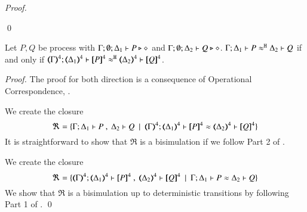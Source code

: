 \begin{proof}
\begin{enumerate}[$\bullet$]
	\end{enumerate}
	\qed
\end{proof}


\begin{proposition}\myrm
	\label{app:prop:fulla_pHOp_to_HOp}
	Let $P, Q$ be \HOpp process with $\Gamma; \emptyset; \Delta_1 \vdash P \triangleright \diamond$ and 
	$\Gamma; \emptyset; \Delta_2 \vdash Q \triangleright \diamond$.
	$\Gamma; \Delta_1 \vdash P \approx^\mathtt{H} \Delta_2 \vdash Q$ if and only if $\horel{\tmap{\Gamma}{4}}{\tmap{\Delta_1}{4}}{\pmap{P}{4}}{\hwb}{\tmap{\Delta_2}{4}}{\pmap{Q}{4}}$.
\end{proposition}

\begin{proof}
	The proof for both direction is a consequence of Operational Correspondence,
	.


	\noi We create the closure
%
	\[
		\Re = \set{\horel{\Gamma}{\Delta_1}{P}{\ ,\ }{\Delta_2}{Q} \setbar \horel{\tmap{\Gamma}{4}}{\tmap{\Delta_1}{4}}{\pmap{P}{4}}{\wb}{\tmap{\Delta_2}{4}}{\pmap{Q}{4}}}
	\]
%
	\noi	It is straightforward to show that $\Re$ is a bisimulation if we follow Part 2 of
		.


	\noi We create the closure
%
	\[
		\Re = \set{\horel{\tmap{\Gamma}{4}}{\tmap{\Delta_1}{4}}{\pmap{P}{4}}{\ ,\ }{\tmap{\Delta_2}{4}}{\pmap{Q}{4}} \setbar \horel{\Gamma}{\Delta_1}{P}{\wb}{\Delta_2}{Q}}
	\]
%
	\noi	We show that $\Re$ is a bisimulation up to deterministic transitions
		by following Part 1 of .
	\qed
\end{proof}

